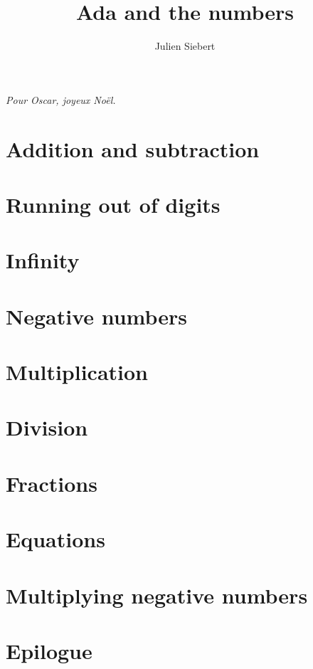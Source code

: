 \documentclass[a5paper,11pt,onecolumn]{book}
\title{Ada and the numbers}
\author{Julien Siebert}
\begin{document}
\maketitle
\textit{Pour Oscar, joyeux Noël.}
\chapter{}

\chapter[]{Addition and subtraction}

\chapter[]{Running out of digits}

\chapter[]{Infinity}

\chapter[]{Negative numbers}

\chapter[]{Multiplication}

\chapter[]{Division}

\chapter[]{Fractions}

\chapter[]{Equations}

\chapter[]{Multiplying negative numbers}

\chapter[]{Epilogue}

\end{document}
